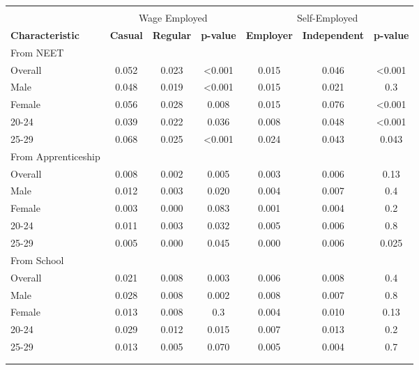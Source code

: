 \begin{longtable}{lcccccc}
\\[-1.8ex]\hline 
\hline \\[-1.8ex] 
 & \multicolumn{3}{c}{Wage Employed} & \multicolumn{3}{c}{Self-Employed} \\ 
 \cmidrule(lr){2-4} \cmidrule(lr){5-7}
\textbf{Characteristic} & \textbf{Casual} & \textbf{Regular} & \textbf{p-value} & \textbf{Employer} & \textbf{Independent} & \textbf{p-value} \\ 
\midrule
From NEET &&&&& \\
Overall & 0.052 & 0.023 & <0.001 & 0.015 & 0.046 & <0.001 \\ 
Male & 0.048 & 0.019 & <0.001 & 0.015 & 0.021 & 0.3 \\ 
Female & 0.056 & 0.028 & 0.008 & 0.015 & 0.076 & <0.001 \\ 
20-24 & 0.039 & 0.022 & 0.036 & 0.008 & 0.048 & <0.001 \\ 
25-29 & 0.068 & 0.025 & <0.001 & 0.024 & 0.043 & 0.043 \\ 
\midrule
From Apprenticeship &&&&& \\
Overall & 0.008 & 0.002 & 0.005 & 0.003 & 0.006 & 0.13 \\ 
Male & 0.012 & 0.003 & 0.020 & 0.004 & 0.007 & 0.4 \\ 
Female & 0.003 & 0.000 & 0.083 & 0.001 & 0.004 & 0.2 \\ 
20-24 & 0.011 & 0.003 & 0.032 & 0.005 & 0.006 & 0.8 \\ 
25-29 & 0.005 & 0.000 & 0.045 & 0.000 & 0.006 & 0.025 \\ 
\midrule
From School &&&&& \\
Overall & 0.021 & 0.008 & 0.003 & 0.006 & 0.008 & 0.4 \\ 
Male & 0.028 & 0.008 & 0.002 & 0.008 & 0.007 & 0.8 \\ 
Female & 0.013 & 0.008 & 0.3 & 0.004 & 0.010 & 0.13 \\ 
20-24 & 0.029 & 0.012 & 0.015 & 0.007 & 0.013 & 0.2 \\ 
25-29 & 0.013 & 0.005 & 0.070 & 0.005 & 0.004 & 0.7 \\ 
\\[-1.8ex]\hline 
\hline \\[-1.8ex] 
\end{longtable}
